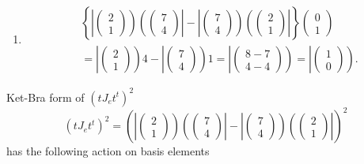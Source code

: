\documentclass[aps,preprint]{revtex4}
\begin{document}
\begin{enumerate}
\item 
\begin{align}
& \left\{ \left\vert \left( 
\begin{array}{c}
2 \\ 
1%
\end{array}%
\right) \right) \left( \left( 
\begin{array}{c}
7 \\ 
4%
\end{array}%
\right) \right\vert -\left\vert \left( 
\begin{array}{c}
7 \\ 
4%
\end{array}%
\right) \right) \left( \left( 
\begin{array}{c}
2 \\ 
1%
\end{array}%
\right) \right\vert \right\} \left( 
\begin{array}{c}
0 \\ 
1%
\end{array}%
\right) \\
& =\left\vert \left( 
\begin{array}{c}
2 \\ 
1%
\end{array}%
\right) \right) 4-\left\vert \left( 
\begin{array}{c}
7 \\ 
4%
\end{array}%
\right) \right) 1=\left\vert \left( 
\begin{array}{c}
8-7 \\ 
4-4%
\end{array}%
\right) \right) =\left\vert \left( 
\begin{array}{c}
1 \\ 
0%
\end{array}%
\right) \right) .
\end{align}
\end{enumerate}

Ket-Bra form of $\left( tJ_{e}t^{t}\right) ^{2}$ 
\begin{equation}
\left( tJ_{e}t^{t}\right) ^{2}=\left( \left\vert \left( 
\begin{array}{c}
2 \\ 
1%
\end{array}%
\right) \right) \left( \left( 
\begin{array}{c}
7 \\ 
4%
\end{array}%
\right) \right\vert -\left\vert \left( 
\begin{array}{c}
7 \\ 
4%
\end{array}%
\right) \right) \left( \left( 
\begin{array}{c}
2 \\ 
1%
\end{array}%
\right) \right\vert \right) ^{2}
\end{equation}%
has the following action on basis elements
\end{document}
